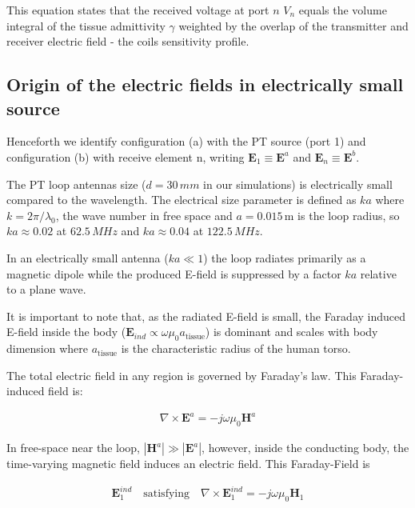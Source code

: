 This equation states that the received voltage at port $n$ $V_n$ equals the volume integral of the tissue admittivity $\gamma$ weighted by the overlap of the transmitter and receiver electric field - the coils sensitivity profile.

\subsection{Origin of the electric fields in electrically small source}

Henceforth we identify configuration (a) with the PT source (port 1) and configuration (b) with receive element n, writing $\mathbf{E}_1 \equiv \mathbf{E}^a$ and $\mathbf{E}_n \equiv \mathbf{E}^b$.

The PT loop antennas size ($d=30\,mm$ in our simulations) is electrically small compared to the wavelength. The electrical size parameter is defined as $ka$ where $k=2 \pi / \lambda_0$, the wave number in free space and $a=0.015\,\mathrm{m}$ is the loop radius, so $ka\approx 0.02$ at $62.5\,MHz$ and $ka\approx 0.04$ at $122.5\,MHz$. 

In an electrically small antenna ($ka \ll 1$) the loop radiates primarily as a magnetic dipole while the produced E-field is suppressed by a factor $ka$ relative to a plane wave.

It is important to note that, as the radiated E-field is small, the Faraday induced E-field inside the body ($\mathbf{E}_{ind} \propto \omega \mu_0 a_{\mathrm{tissue}}$) is dominant and scales with body dimension where $a_{\mathrm{tissue}}$ is the characteristic radius of the human torso.

The total electric field in any region is governed by Faraday's law. This Faraday-induced field is:

\begin{align}
    \label{inducedField}
    \nabla \times \mathbf{E}^a = -j \omega \mu_0 \mathbf{H}^a
\end{align}

In free-space near the loop, $|\mathbf{H}^a| \gg |\mathbf{E}^a|$, however, inside the conducting body, the time-varying magnetic field induces an electric field. This Faraday-Field is

\begin{align}
    \label{FaradayField}
    \mathbf{E}_1^{ind} \quad \text{satisfying} \quad \nabla \times \mathbf{E}_1^{ind} = -j \omega \mu_0 \mathbf{H}_1
\end{align}

